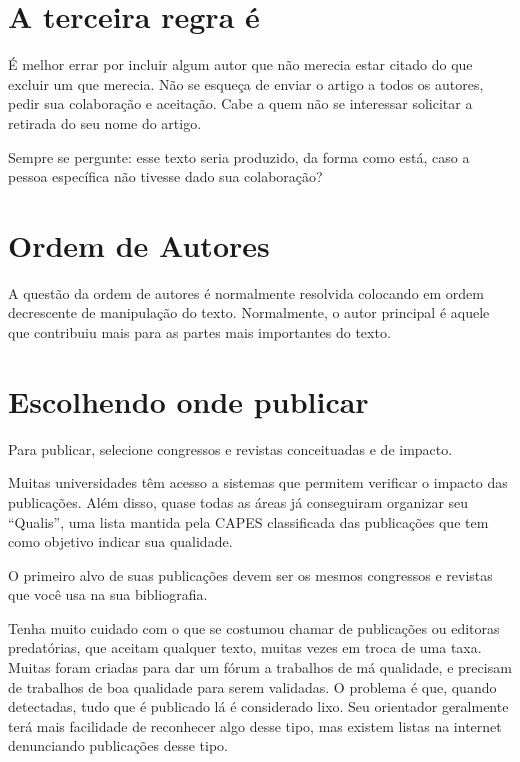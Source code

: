 \section{A terceira regra é}


É melhor errar por incluir algum autor que não merecia estar citado do que excluir um que merecia. Não se esqueça de enviar o artigo a todos os autores, pedir sua colaboração e aceitação. Cabe a quem não se interessar solicitar a retirada do seu nome do artigo. 

Sempre se pergunte: esse texto seria produzido, da forma como está, caso a pessoa específica não tivesse dado sua colaboração? 

\section{Ordem de Autores}

A questão da ordem de autores é normalmente resolvida colocando em ordem decrescente de manipulação do texto. Normalmente, o autor principal é aquele que contribuiu mais para as partes mais importantes do texto. 

\section{Escolhendo onde publicar}

Para publicar, selecione congressos e revistas conceituadas e de impacto. 

Muitas universidades têm acesso a sistemas que permitem verificar o impacto das publicações. Além disso, quase todas as áreas já conseguiram organizar seu ``Qualis'', uma lista mantida pela CAPES classificada das publicações que tem como objetivo indicar sua qualidade. 

O primeiro alvo de suas publicações devem ser os mesmos congressos e revistas que você usa na sua bibliografia.

Tenha muito cuidado com o que se costumou chamar de publicações ou editoras predatórias, que aceitam qualquer texto, muitas vezes em troca de uma taxa. Muitas foram criadas para dar um fórum a trabalhos de má qualidade, e precisam de trabalhos de boa qualidade para serem validadas. O problema é que, quando detectadas, tudo que é publicado lá é considerado lixo. Seu orientador geralmente terá mais facilidade de reconhecer algo desse tipo, mas existem listas na internet denunciando publicações desse tipo.

